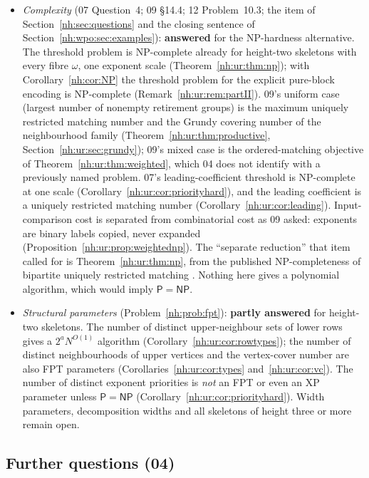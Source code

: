 \documentclass[11pt,a4paper]{article}
\theoremstyle{definition}
\theoremstyle{remark}
\begin{document}
\begin{itemize}
\item \emph{Complexity} (07 Question~4; 09 \S14.4; 12 Problem~10.3; the item
of Section~\ref{nh:sec:questions} and the closing sentence of
Section~\ref{nh:wpo:sec:examples}): \textbf{answered} for the NP-hardness
alternative. The threshold problem is NP-complete already for height-two
skeletons with every fibre $\omega$, one exponent scale
(Theorem~\ref{nh:ur:thm:np}); with Corollary~\ref{nh:cor:NP} the threshold
problem for the explicit pure-block encoding is NP-complete
(Remark~\ref{nh:ur:rem:partII}). 09's uniform case (largest number of nonempty
retirement groups) is the maximum uniquely restricted matching number and the
Grundy covering number of the neighbourhood family
(Theorem~\ref{nh:ur:thm:productive}, Section~\ref{nh:ur:sec:grundy}); 09's mixed
case is the ordered-matching objective of Theorem~\ref{nh:ur:thm:weighted},
which 04 does not identify with a previously named problem. 07's
leading-coefficient threshold is NP-complete at one scale
(Corollary~\ref{nh:ur:cor:priorityhard}), and the leading coefficient is a
uniquely restricted matching number (Corollary~\ref{nh:ur:cor:leading}).
Input-comparison cost is separated from combinatorial cost as 09 asked:
exponents are binary labels copied, never expanded
(Proposition~\ref{nh:ur:prop:weightednp}). The ``separate reduction'' that
item called for is Theorem~\ref{nh:ur:thm:np}, from the published
NP-completeness of bipartite uniquely restricted matching \cite{GHL2001}.
Nothing here gives a polynomial algorithm, which would imply
$\mathsf P=\mathsf{NP}$.
\item \emph{Structural parameters} (Problem~\ref{nh:prob:fpt}):
\textbf{partly answered} for height-two skeletons. The number of distinct
upper-neighbour sets of lower rows gives a $2^aN^{O(1)}$ algorithm
(Corollary~\ref{nh:ur:cor:rowtypes}); the number of distinct neighbourhoods
of upper vertices and the vertex-cover number are also FPT parameters
(Corollaries~\ref{nh:ur:cor:types} and~\ref{nh:ur:cor:vc}). The number of
distinct exponent priorities is \emph{not} an FPT or even an XP parameter
unless $\mathsf P=\mathsf{NP}$ (Corollary~\ref{nh:ur:cor:priorityhard}).
Width parameters, decomposition widths and all skeletons of height three or
more remain open.
\end{itemize}

\subsection{Further questions (04)}
\end{document}
